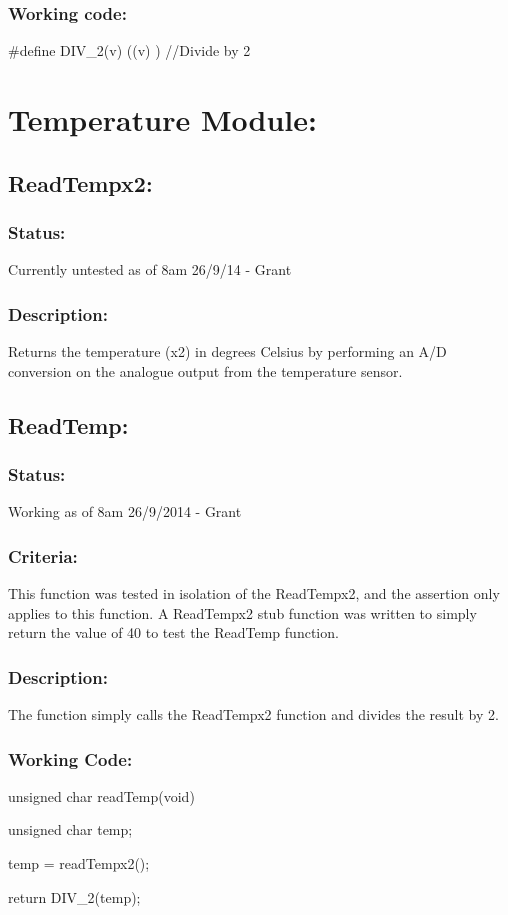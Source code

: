 \documentclass[]{article}
\begin{document}
\subsubsection{Working code:}
\#define DIV\_2(v) ((v) \>)       //Divide by 2

\section{Temperature Module:}

\subsection{ReadTempx2:}

\subsubsection{Status:}
Currently untested as of 8am 26/9/14 - Grant

\subsubsection{Description:}
Returns the temperature (x2) in degrees Celsius by performing an A/D conversion on the analogue output from the temperature sensor.

\subsection{ReadTemp:}
\subsubsection{Status:}
Working as of 8am 26/9/2014 - Grant

\subsubsection{Criteria:}
This function was tested in isolation of the ReadTempx2, and the assertion only applies to this function. A ReadTempx2 stub function was written to simply return the value of 40 to test the ReadTemp function.

\subsubsection{Description:}
The function simply calls the ReadTempx2 function and divides the result by 2.

\subsubsection{Working Code:}
unsigned char readTemp(void)
{
	unsigned char temp;
	
	temp = readTempx2();
	
	return DIV\_2(temp);
}
\end{document}
